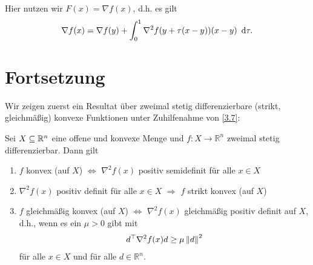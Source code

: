 Hier nutzen wir $F(x)=\nabla f(x)$, d.h. es gilt
\begin{align}\label{MWS_intform}
	\nabla f(x) = \nabla f(y) + \int_0^1 \nabla^2 f(y+\tau(x-y))(x-y)\enskip \mathrm{d}\tau.
\end{align}

\section{Fortsetzung}

Wir zeigen zuerst ein Resultat über zweimal stetig differenzierbare
(strikt, gleichmäßig) konvexe Funktionen unter Zuhilfenahme von
\cref{3.7}:

\begin{satz}\label{satz3.8}%
	Sei $X \subseteq \mathbb{R}^n$ eine offene und konvexe Menge und
	$f\colon X\to\mathbb{R}^n$ zweimal stetig differenzierbar. Dann gilt
	\begin{enumerate}[label=(\alph*), leftmargin=*, nolistsep]
		\item $f$ konvex (auf $X$) $\Longleftrightarrow$ $\nabla^2 f(x)$
		positiv semidefinit für alle $x\in X$
		\item $\nabla^2 f(x)$ positiv definit für alle $x\in X$
		$\Longrightarrow$ $f$ strikt konvex (auf $X$)
		\item $f$ gleichmäßig konvex (auf $X$) $\Longleftrightarrow$
		$\nabla^2 f(x)$ gleichmäßig positiv definit auf $X$, d.h.,
		wenn es ein $\mu>0$ gibt mit
		\begin{align}\label{eq:3.11}
		d^\top\nabla^2 f(x)d\geq\mu\left\lVert d \right\rVert^2
		\end{align}
		für alle $x\in X$ und für alle $d\in\mathbb{R}^n$.
	\end{enumerate}
\end{satz}

